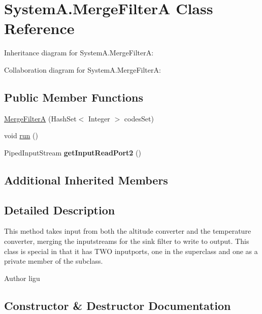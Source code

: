 \hypertarget{class_system_a_1_1_merge_filter_a}{}\section{System\+A.\+Merge\+Filter\+A Class Reference}
\label{class_system_a_1_1_merge_filter_a}


Inheritance diagram for System\+A.\+Merge\+Filter\+A\+:


Collaboration diagram for System\+A.\+Merge\+Filter\+A\+:
\subsection*{Public Member Functions}
\begin{DoxyCompactItemize}
\item 
\hyperlink{class_system_a_1_1_merge_filter_a_acdc58d2d95e2a59ff8a6731aa18d7c2d}{Merge\+Filter\+A} (Hash\+Set$<$ Integer $>$ codes\+Set)
\item 
void \hyperlink{class_system_a_1_1_merge_filter_a_acab836dc5b0be101c3da5ab856477172}{run} ()
\item 
\hypertarget{class_system_a_1_1_merge_filter_a_a2448cf368797f26dc1eacf80a1a1ece4}{}Piped\+Input\+Stream {\bfseries get\+Input\+Read\+Port2} ()\label{class_system_a_1_1_merge_filter_a_a2448cf368797f26dc1eacf80a1a1ece4}

\end{DoxyCompactItemize}
\subsection*{Additional Inherited Members}


\subsection{Detailed Description}
This method takes input from both the altitude converter and the temperature converter, merging the inputstreams for the sink filter to write to output. This class is special in that it has T\+W\+O inputports, one in the superclass and one as a private member of the subclass. \begin{DoxyAuthor}{Author}
ligu 
\end{DoxyAuthor}


\subsection{Constructor \& Destructor Documentation}
\hypertarget{class_system_a_1_1_merge_filter_a_acdc58d2d95e2a59ff8a6731aa18d7c2d}{}
